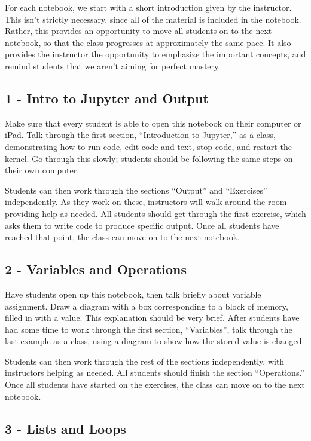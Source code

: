 \documentclass[11pt]{article}
\begin{document}
For each notebook, we start with a short introduction given by the instructor. This isn't strictly necessary, since all of the material is included in the notebook. Rather, this provides an opportunity to move all students on to the next notebook, so that the class progresses at approximately the same pace. It also provides the instructor the opportunity to emphasize the important concepts, and remind students that we aren't aiming for perfect mastery.

\subsection*{1 - Intro to Jupyter and Output}

Make sure that every student is able to open this notebook on their computer or iPad. Talk through the first section, ``Introduction to Jupyter,'' as a class, demonstrating how to run code, edit code and text, stop code, and restart the kernel. Go through this slowly; students should be following the same steps on their own computer.

Students can then work through the sections ``Output'' and ``Exercises'' independently. As they work on these, instructors will walk around the room providing help as needed. All students should get through the first exercise, which asks them to write code to produce specific output. Once all students have reached that point, the class can move on to the next notebook. 

\subsection*{2 - Variables and Operations}

Have students open up this notebook, then talk briefly about variable assignment. Draw a diagram with a box corresponding to a block of memory, filled in with a value. This explanation should be very brief. After students have had some time to work through the first section, ``Variables'', talk through the last example as a class, using a diagram to show how the stored value is changed.

Students can then work through the rest of the sections independently, with instructors helping as needed. All students should finish the section ``Operations.'' Once all students have started on the exercises, the class can move on to the next notebook.

\subsection*{3 - Lists and Loops}
\end{document}
